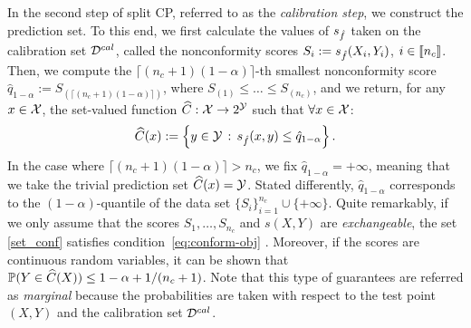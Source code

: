 In the second step of split CP, referred to as the \textit{calibration step}, we construct the prediction set. To this end, we first calculate the values of $s_{\hat{f}}$ taken on the calibration set ${\cal D}^{cal}$, 
called the nonconformity scores 
$S_i := s_{\hat{f}}(X_i,Y_i)$, $i \in \llbracket n_c \rrbracket$. Then, we compute the $\lceil (n_c+1)(1-\alpha) \rceil$-th smallest nonconformity score 
$\hat{q}_{1-\alpha}:=S_{(\lceil (n_c+1)(1-\alpha) \rceil)}$, %
%
%
where $S_{(1)} \leq \ldots \leq S_{(n_c)}$, and we return, for any $x\in {\cal X}$, the set-valued function ${\widehat{C}}:{\cal X} \rightarrow 2^{\cal Y}$ such that $\forall x\in{\cal X}$:
%
\begin{align}
\label{set_conf}
{\widehat{C}}(x) 
:= \Bigl\{ y \in {\cal Y} \,:\, s_{\hat{f}}(x, y) \leq \hat{q}_{1-\alpha} \Bigr\} 
\, . 
\end{align} 
%
In the case where $\lceil (n_c+1)(1-\alpha) \rceil>n_c$, we fix $\hat{q}_{1-\alpha} = +\infty$, meaning that we take the trivial prediction set ${\widehat{C}}(x) = {\cal Y}$. %
 Stated differently, $\hat{q}_{1-\alpha}$ corresponds to the $(1-\alpha)$-quantile of the data set $\{S_i\}_{i=1}^{n_c}\cup \{+\infty\}$. Quite remarkably, if we only assume that the scores $S_1,\ldots, S_{n_c}$ and $s(X, Y)$ are \textit{exchangeable}, the set \eqref{set_conf} satisfies condition~\eqref{eq:conform-obj} \citep{papadopoulos2002inductive}. Moreover, if the scores are continuous random variables, it can be shown that ${\mathbb{P}}(Y\in {\widehat{C}}(X)) \leq 1-\alpha + 1/(n_c+1)$. Note that this type of guarantees are referred as \textit{marginal} because the probabilities are taken with respect to the test point $(X,Y)$ and the calibration set ${\cal D}^{cal}$. %

